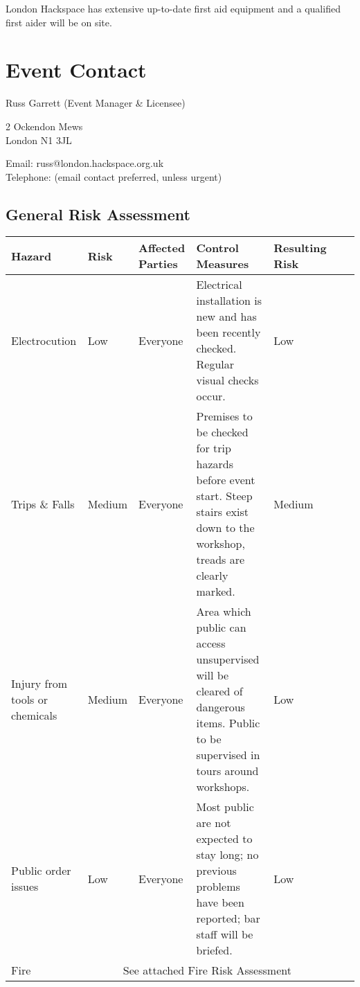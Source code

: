 London Hackspace has extensive up-to-date first aid equipment and a qualified first aider will be on site.

\section{Event Contact}

Russ Garrett (Event Manager \& Licensee)

2 Ockendon Mews \\
London N1 3JL

Email: russ@london.hackspace.org.uk \\
Telephone:  (email contact preferred, unless urgent)


\begin{landscape}

\section{General Risk Assessment}

\begin{tabular}{ | p{3cm} | l | p{1.5cm} | p{8cm} | p{1.5cm} | p{2cm} | p{5cm} | }
\hline
\textbf{Hazard} & \textbf{Risk} & \textbf{Affected Parties}
& \textbf{Control Measures} & \textbf{Resulting Risk} \\ \hline

Electrocution & Low & Everyone &
Electrical installation is new and has been recently checked. Regular visual checks occur. &
Low \\ \hline

Trips \& Falls & Medium & Everyone &
Premises to be checked for trip hazards before event start. Steep stairs exist down to the workshop,
treads are clearly marked. & Medium \\ \hline

Injury from tools or chemicals & Medium & Everyone &
Area which public can access unsupervised will be cleared of dangerous items. Public to be supervised
in tours around workshops.
& Low  \\ \hline

Public order issues & Low & Everyone &
Most public are not expected to stay long; no previous problems have been reported; bar staff will be briefed.
& Low  \\ \hline

Fire & \multicolumn{4}{|c|}{See attached Fire Risk Assessment} \\ \hline

\end{tabular}
\end{landscape}

